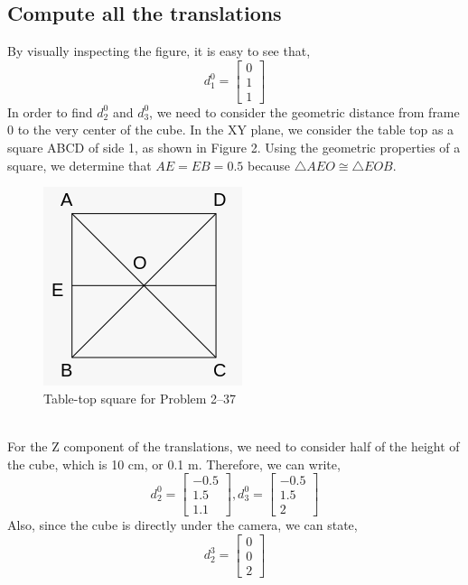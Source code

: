 \documentclass[conference]{IEEEtran}
\begin{document}
\subsection{Compute all the translations}
By visually inspecting the figure, it is easy to see that,
\[
    d^0_1 = \begin{bmatrix}
        0\\
        1\\
        1
    \end{bmatrix}
\]
In order to find $d^0_2$ and $d^0_3$, we need to consider
the geometric distance from frame 0 to the very center of the cube.
In the XY plane, we consider the table top as a square ABCD of side 1,
as shown in Figure 2. Using the geometric properties of a square, we
determine that $AE = EB = 0.5$ because $\triangle AEO \cong \triangle EOB$.
\begin{figure}[h]
    \includegraphics[scale=0.5]{./tabletop.png}
    \centering
    \caption{Table-top square for Problem 2--37}
\end{figure}\\
For the Z component of the translations, we need to consider half of the height
of the cube, which is 10 cm, or 0.1 m. Therefore, we can write,
\[
    d^0_2 = \begin{bmatrix}
        -0.5\\
        1.5\\
        1.1
    \end{bmatrix},
    d^0_3 = \begin{bmatrix}
        -0.5\\
        1.5\\
        2
    \end{bmatrix}
\]
Also, since the cube is directly under the camera, we can state,
\[
    d^3_2 = \begin{bmatrix}
        0\\
        0\\
        2
    \end{bmatrix}
\]
\vspace{0.1in}
\end{document}
